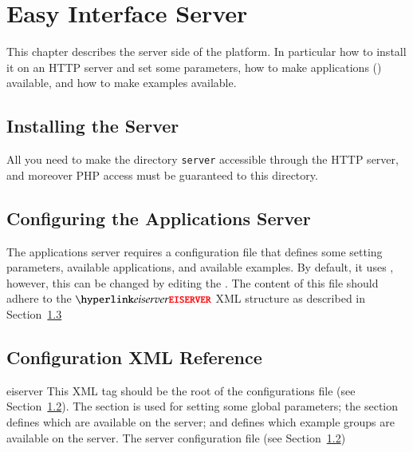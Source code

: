 {%
}
\chapter{Easy Interface Server}

This chapter describes the server side of the \ei platform. In
particular how to install it on an HTTP server and set some
parameters, how to make applications (\apps) available, and how to
make examples available.


\section{Installing the Server}
 
All you need to make the directory \lstinline{server} accessible
through the HTTP server, and moreover PHP access must be guaranteed
to this directory.



\section{Configuring the Applications Server}
\label{server:sec:config}

The applications server requires a configuration file that defines
some setting parameters, available applications, and available
examples.
%
By default, it uses , however, this can
be changed by editing the .
%
The content of this file should adhere to the
$\xmlstructrefwb{eiserver}$ XML structure as described in
Section~\ref{sec:server:xmfref}

\section{Configuration XML Reference}
\label{sec:server:xmfref}

\bigskip
\xmlstruct
{eiserver}
{
%
  This XML tag should be the root of the configurations file (see
  Section~\ref{server:sec:config}).
%
  The  section is used for setting some global
  parameters; the  section defines which \apps are
  available on the server; and  defines which
  example groups are available on the server.
%
}
{
%
  The server configuration file (see Section~\ref{server:sec:config})
%
}


